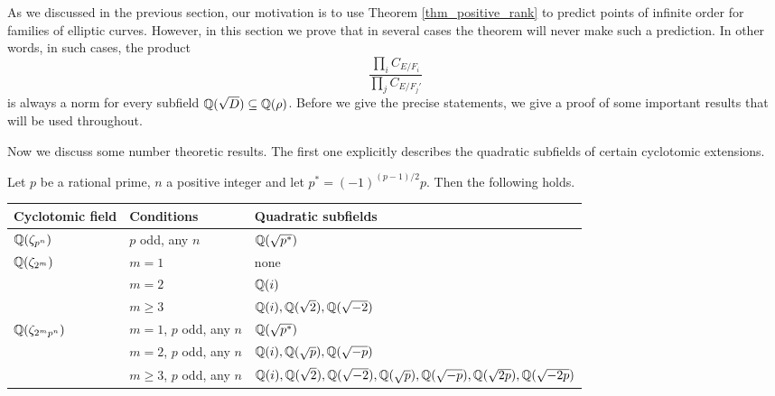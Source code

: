 As we discussed in the previous section, our motivation is to use Theorem \ref{thm_positive_rank} to predict points of infinite order for families of elliptic curves. However, in this section we prove that in several cases the theorem will never make such a prediction. In other words, in such cases, the product 
$$\frac{\prod_i C_{E/F_i}}{\prod_j C_{E/F_j'}}$$ 
is always a norm for every subfield $\mathbb{Q}(\sqrt{D})\subseteq\mathbb{Q}(\rho)$. Before we give the precise statements, we give a proof of some important results that will be used throughout. 



Now we discuss some number theoretic results. 
The first one explicitly describes the quadratic subfields of certain cyclotomic extensions.

\begin{lemma}\label{lem_subfields}
    Let $p$ be a rational prime, $n$ a positive integer and let $p^*=(-1)^{(p-1)/2}p$. Then the following holds.

    \begin{table}[!ht]
        \centering
        \begin{tabular}{|l|l|l|}
        \hline
        Cyclotomic field                    & Conditions & Quadratic subfields                   \\ \hline
        $\mathbb{Q}(\zeta_{p^n})$                  & $p$ odd, any $n$    & $\mathbb{Q}(\sqrt{p^*})$            \\ \hline
        \multirow{3}{*}{$\mathbb{Q}(\zeta_{2^m})$} & $m=1$      & none                                  \\ \cline{2-3} 
                                            & $m=2$      & $\mathbb{Q}(i)$                              \\ \cline{2-3} 
                                            & $m\geq3$   & $\mathbb{Q}(i),\mathbb{Q}(\sqrt{2}),\mathbb{Q}(\sqrt{-2})$ \\ \hline
        \multirow{3}{*}{$\mathbb{Q}(\zeta_{2^mp^n})$}  & $m=1$, $p$ odd, any $n$      & $\mathbb{Q}(\sqrt{p^*})$     \\ \cline{2-3} 
                                            & $m=2$, $p$ odd, any $n$      & $\mathbb{Q}(i),\mathbb{Q}(\sqrt{p}),\mathbb{Q}(\sqrt{-p})$                              \\ \cline{2-3}
                                            & $m\geq 3$, $p$ odd, any $n$      & $\mathbb{Q}(i),\mathbb{Q}(\sqrt{2}),\mathbb{Q}(\sqrt{-2}),\mathbb{Q}(\sqrt{p}),\mathbb{Q}(\sqrt{-p}),\mathbb{Q}(\sqrt{2p}),\mathbb{Q}(\sqrt{-2p})$                              \\ 
                                             \hline
        \end{tabular}
        \end{table}

\end{lemma}

